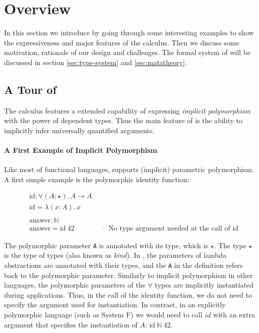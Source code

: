 \section{Overview}

In this section we introduce \name by going through
some interesting examples to show the expressiveness and major features of the calculus.
Then we discuss some motivation, rationale of our design and challenges.
The formal system of \name will be
discussed in section \ref{sec:type-system} and \ref{sec:matatheory}.

\subsection{A Tour of \name}
\label{sec:examples}

The \name calculus features a extended capability of expressing \emph{implicit
  polymorphism} with the power of dependent types. Thus the main feature of \name
is the ability to implicitly infer universally quantified arguments.

\paragraph{A First Example of Implicit Polymorphism}
Like most of functional languages, \name supports (implicit) parametric polymorphism.
A first simple example is the polymorphic identity
function:

\begin{align*}
&\mathrm{id} : \forall (A : \star).\, A \rightarrow A \\
&\mathrm{id} = \lambda (x : A).\, x \\
\\
&\mathrm{answer} : \mathbb{N} \\
&\mathrm{answer} = \mathrm{id} ~ 42  \quad\quad\quad\quad    \text{-- No type argument needed at the call of $\mathrm{id}$}
\end{align*}

\noindent The polymorphic parameter \verb|A| is annotated with its type,
which is $\star$. The type $\star$ is the type of types (also known as
\emph{kind}). In \name, the parameters of lambda abstractions are annotated
with their types, and the \verb|A| in the definition refers back to the
polymorphic parameter. Similarly to implicit polymorphism in other languages,
the polymorphic parameters of the $\forall$ types are implicitly instantiated
during applications. Thus, in the call of the identity function, we
do not need to specify the argument used for instantiation. In contrast,
in an explicitly polymorphic language (such as System F) we would need
to call $id$ with an extra argument that specifies the instantiation of $A$:
$\mathrm{id}~\mathbb{N}~ 42$.


